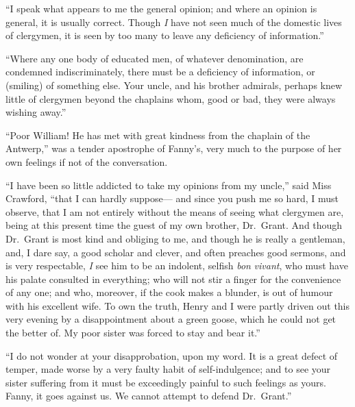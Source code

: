 ``I speak what appears to me the general opinion;
and where an opinion is general, it is usually correct.
Though \emph{I} have not seen much of the domestic lives
of clergymen, it is seen by too many to leave any deficiency
of information.''

``Where any one body of educated men, of whatever denomination,
are condemned indiscriminately, there must be a deficiency
of information, or (smiling) of something else.
Your uncle, and his brother admirals, perhaps knew little
of clergymen beyond the chaplains whom, good or bad,
they were always wishing away.''

``Poor William!  He has met with great kindness from
the chaplain of the Antwerp,'' was a tender apostrophe
of Fanny's, very much to the purpose of her own feelings
if not of the conversation.

``I have been so little addicted to take my opinions from
my uncle,'' said Miss Crawford, ``that I can hardly suppose---%
and since you push me so hard, I must observe, that I am
not entirely without the means of seeing what clergymen are,
being at this present time the guest of my own brother,
Dr.\ Grant.  And though Dr.\ Grant is most kind and obliging
to me, and though he is really a gentleman, and, I dare say,
a good scholar and clever, and often preaches good sermons,
and is very respectable, \emph{I} see him to be an indolent,
selfish \emph{bon} \emph{vivant}, who must have his palate consulted
in everything; who will not stir a finger for the convenience
of any one; and who, moreover, if the cook makes a blunder,
is out of humour with his excellent wife.  To own the truth,
Henry and I were partly driven out this very evening
by a disappointment about a green goose, which he could
not get the better of.  My poor sister was forced to stay
and bear it.''

``I do not wonder at your disapprobation, upon my word.
It is a great defect of temper, made worse by a very faulty
habit of self-indulgence; and to see your sister suffering
from it must be exceedingly painful to such feelings
as yours.  Fanny, it goes against us.  We cannot attempt
to defend Dr.\ Grant.''

